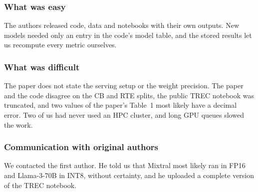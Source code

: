 \subsubsection*{What was easy}

The authors released code, data and notebooks with their own outputs. New
models needed only an entry in the code's model table, and the stored results
let us recompute every metric ourselves.

\subsubsection*{What was difficult}

The paper does not state the serving setup or the weight precision. The paper
and the code disagree on the CB and RTE splits, the public TREC notebook was
truncated, and two values of the paper's Table~1 most likely have a decimal
error. Two of us had never used an HPC cluster, and long GPU queues slowed the
work.

\subsubsection*{Communication with original authors}

We contacted the first author. He told us that Mixtral most likely ran in FP16
and Llama-3-70B in INT8, without certainty, and he uploaded a complete version
of the TREC notebook.
